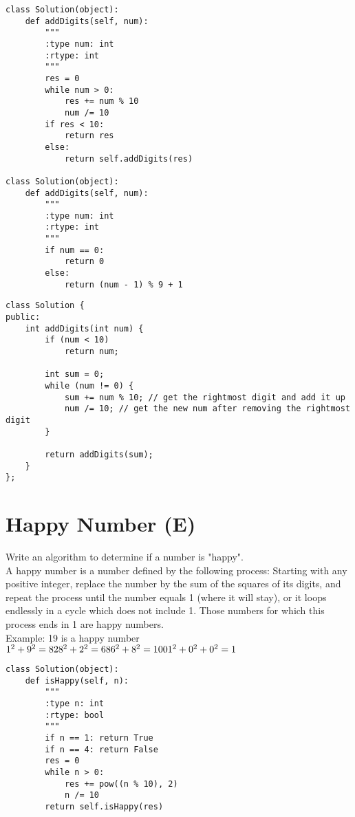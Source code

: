 \begin{lstlisting}
class Solution(object):
    def addDigits(self, num):
        """
        :type num: int
        :rtype: int
        """
        res = 0
        while num > 0:
            res += num % 10
            num /= 10
        if res < 10: 
            return res
        else:
            return self.addDigits(res)
    
class Solution(object):
    def addDigits(self, num):
        """
        :type num: int
        :rtype: int
        """
        if num == 0:
            return 0
        else:
            return (num - 1) % 9 + 1
\end{lstlisting}

\begin{lstlisting}
class Solution {
public:
    int addDigits(int num) {
        if (num < 10)
            return num;
        
        int sum = 0;
        while (num != 0) {
            sum += num % 10; // get the rightmost digit and add it up
            num /= 10; // get the new num after removing the rightmost digit
        }
        
        return addDigits(sum);
    }
};
\end{lstlisting}


\section{Happy Number (E)}
Write an algorithm to determine if a number is "happy".\\

A happy number is a number defined by the following process: Starting with any positive integer, replace the number by the sum of the squares of its digits, and repeat the process until the number equals 1 (where it will stay), or it loops endlessly in a cycle which does not include 1. Those numbers for which this process ends in 1 are happy numbers.\\

Example: 19 is a happy number\\

    $1^2 + 9^2 = 82\\
    8^2 + 2^2 = 68\\
    6^2 + 8^2 = 100\\
    1^2 + 0^2 + 0^2 = 1$\\

\begin{lstlisting}
class Solution(object):
    def isHappy(self, n):
        """
        :type n: int
        :rtype: bool
        """
        if n == 1: return True
        if n == 4: return False
        res = 0
        while n > 0:
            res += pow((n % 10), 2)
            n /= 10
        return self.isHappy(res)
\end{lstlisting}
            
